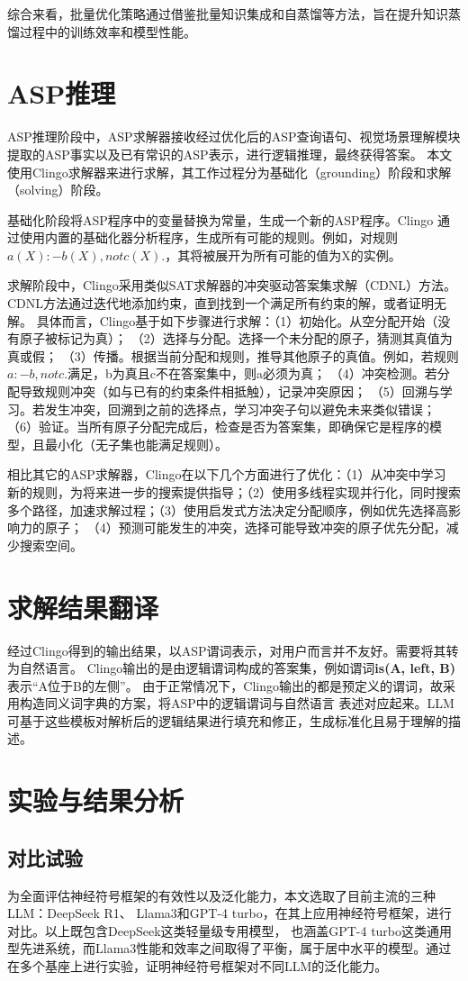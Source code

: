 综合来看，批量优化策略通过借鉴批量知识集成和自蒸馏等方法，旨在提升知识蒸馏过程中的训练效率和模型性能。
\section{ASP推理}
ASP推理阶段中，ASP求解器接收经过优化后的ASP查询语句、视觉场景理解模块提取的ASP事实以及已有常识的ASP表示，进行逻辑推理，最终获得答案。
本文使用Clingo求解器来进行求解，其工作过程分为基础化（grounding）阶段和求解（solving）阶段。

基础化阶段将ASP程序中的变量替换为常量，生成一个新的ASP程序。Clingo
通过使用内置的基础化器分析程序，生成所有可能的规则。例如，对规则
$a(X) :- b(X), not c(X).$，其将被展开为所有可能的值为X的实例。

求解阶段中，Clingo采用类似SAT求解器的冲突驱动答案集求解（CDNL）方法。CDNL方法通过迭代地添加约束，直到找到一个满足所有约束的解，或者证明无解。
具体而言，Clingo基于如下步骤进行求解：（1）初始化。从空分配开始（没有原子被标记为真）；
（2）选择与分配。选择一个未分配的原子，猜测其真值为真或假；
（3）传播。根据当前分配和规则，推导其他原子的真值。例如，若规则$a :- b, not c.$满足，b为真且c不在答案集中，则a必须为真；
（4）冲突检测。若分配导致规则冲突（如与已有的约束条件相抵触），记录冲突原因；
（5）回溯与学习。若发生冲突，回溯到之前的选择点，学习冲突子句以避免未来类似错误；
（6）验证。当所有原子分配完成后，检查是否为答案集，即确保它是程序的模型，且最小化（无子集也能满足规则）。

相比其它的ASP求解器，Clingo在以下几个方面进行了优化：（1）从冲突中学习
新的规则，为将来进一步的搜索提供指导；（2）使用多线程实现并行化，同时搜索
多个路径，加速求解过程；（3）使用启发式方法决定分配顺序，例如优先选择高影响力的原子；
（4）预测可能发生的冲突，选择可能导致冲突的原子优先分配，减少搜索空间。
\section{求解结果翻译}
经过Clingo得到的输出结果，以ASP谓词表示，对用户而言并不友好。需要将其转为自然语言。
Clingo输出的是由逻辑谓词构成的答案集，例如谓词\textbf{is(A, left, B)}表示“A位于B的左侧”。
由于正常情况下，Clingo输出的都是预定义的谓词，故采用构造同义词字典的方案，将ASP中的逻辑谓词与自然语言
表述对应起来。LLM可基于这些模板对解析后的逻辑结果进行填充和修正，生成标准化且易于理解的描述。
\section{实验与结果分析}
\subsection{对比试验}
为全面评估神经符号框架的有效性以及泛化能力，本文选取了目前主流的三种LLM：DeepSeek R1、
Llama3和GPT-4 turbo，在其上应用神经符号框架，进行对比。以上既包含DeepSeek这类轻量级专用模型，
也涵盖GPT-4 turbo这类通用型先进系统，而Llama3性能和效率之间取得了平衡，属于居中水平的模型。通过
在多个基座上进行实验，证明神经符号框架对不同LLM的泛化能力。

